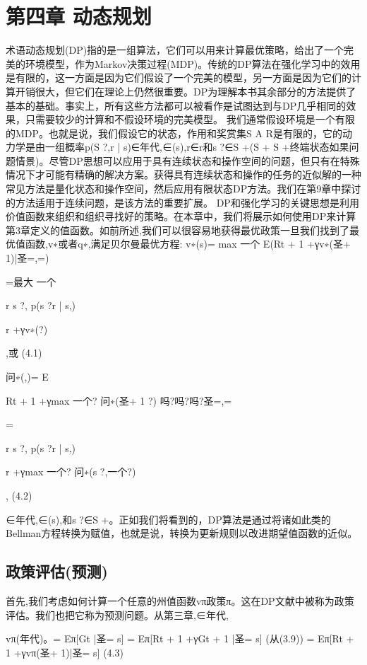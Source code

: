 \chapter{第四章 动态规划}
\begin{summary}

术语动态规划(DP)指的是一组算法，它们可以用来计算最优策略，给出了一个完美的环境模型，作为Markov决策过程(MDP)。传统的DP算法在强化学习中的效用是有限的，这一方面是因为它们假设了一个完美的模型，另一方面是因为它们的计算开销很大，但它们在理论上仍然很重要。DP为理解本书其余部分的方法提供了基本的基础。事实上，所有这些方法都可以被看作是试图达到与DP几乎相同的效果，只需要较少的计算和不假设环境的完美模型。
我们通常假设环境是一个有限的MDP。也就是说，我们假设它的状态，作用和奖赏集S A R是有限的，它的动力学是由一组概率p(S ?,r | s)∈年代,∈(s),r∈r和s ?∈S +(S + S +终端状态如果问题情景)。尽管DP思想可以应用于具有连续状态和操作空间的问题，但只有在特殊情况下才可能有精确的解决方案。获得具有连续状态和操作的任务的近似解的一种常见方法是量化状态和操作空间，然后应用有限状态DP方法。我们在第9章中探讨的方法适用于连续问题，是该方法的重要扩展。
DP和强化学习的关键思想是利用价值函数来组织和组织寻找好的策略。在本章中，我们将展示如何使用DP来计算第3章定义的值函数。如前所述,我们可以很容易地获得最优政策一旦我们找到了最优值函数,v∗或者q∗,满足贝尔曼最优方程:
v∗(s)= max
一个
E(Rt + 1 +γv∗(圣+ 1)|圣=,=)

=最大
一个

r s ?,
p(s ?r | s,)

r +γv∗(?)

,或 					(4.1)

问∗(,)= E

Rt + 1 +γmax
一个?
问∗(圣+ 1 ?)
吗?吗?吗?圣=,=

=

r s ?,
p(s ?r | s,)

r +γmax
一个?
问∗(s ?,一个?)

, 					(4.2)


∈年代,∈(s),和s ?∈S +。正如我们将看到的，DP算法是通过将诸如此类的Bellman方程转换为赋值，也就是说，转换为更新规则以改进期望值函数的近似。
\end{summary}

\section{政策评估(预测)}
首先,我们考虑如何计算一个任意的州值函数vπ政策π。这在DP文献中被称为政策评估。我们也把它称为预测问题。从第三章,∈年代,

vπ(年代)。= Eπ[Gt |圣= s]
= Eπ[Rt + 1 +γGt + 1 |圣= s] 					(从(3.9))
= Eπ[Rt + 1 +γvπ(圣+ 1)|圣= s] 					(4.3)

